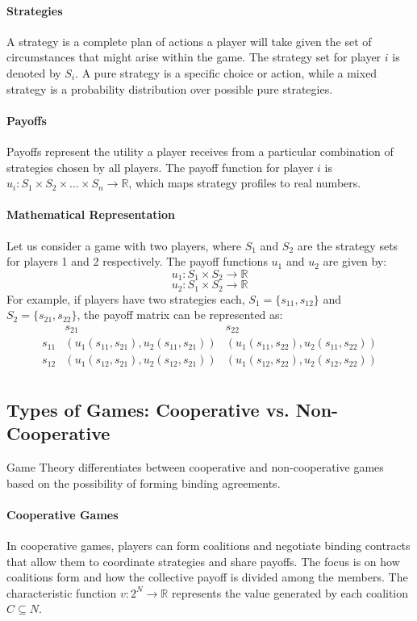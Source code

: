 \documentclass[12pt]{book} %
\begin{document}
\paragraph{Strategies}
A strategy is a complete plan of actions a player will take given the set of circumstances that might arise within the game. The strategy set for player \( i \) is denoted by \( S_i \). A pure strategy is a specific choice or action, while a mixed strategy is a probability distribution over possible pure strategies.

\paragraph{Payoffs}
Payoffs represent the utility a player receives from a particular combination of strategies chosen by all players. The payoff function for player \( i \) is \( u_i: S_1 \times S_2 \times \ldots \times S_n \rightarrow \mathbb{R} \), which maps strategy profiles to real numbers.

\paragraph{Mathematical Representation}
Let us consider a game with two players, where \( S_1 \) and \( S_2 \) are the strategy sets for players 1 and 2 respectively. The payoff functions \( u_1 \) and \( u_2 \) are given by:
\[
u_1: S_1 \times S_2 \rightarrow \mathbb{R}
\]
\[
u_2: S_1 \times S_2 \rightarrow \mathbb{R}
\]
For example, if players have two strategies each, \( S_1 = \{s_{11}, s_{12}\} \) and \( S_2 = \{s_{21}, s_{22}\} \), the payoff matrix can be represented as:
\[
\begin{array}{c|c|c}
 & s_{21} & s_{22} \\
\hline
s_{11} & (u_1(s_{11}, s_{21}), u_2(s_{11}, s_{21})) & (u_1(s_{11}, s_{22}), u_2(s_{11}, s_{22})) \\
\hline
s_{12} & (u_1(s_{12}, s_{21}), u_2(s_{12}, s_{21})) & (u_1(s_{12}, s_{22}), u_2(s_{12}, s_{22})) \\
\end{array}
\]

\subsection{Types of Games: Cooperative vs. Non-Cooperative}
Game Theory differentiates between cooperative and non-cooperative games based on the possibility of forming binding agreements.

\paragraph{Cooperative Games}
In cooperative games, players can form coalitions and negotiate binding contracts that allow them to coordinate strategies and share payoffs. The focus is on how coalitions form and how the collective payoff is divided among the members. The characteristic function \( v: 2^N \rightarrow \mathbb{R} \) represents the value generated by each coalition \( C \subseteq N \).
\end{document}
